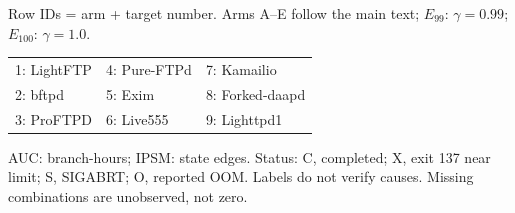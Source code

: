\begingroup
\small
\setlength{\tabcolsep}{1.6pt}
\renewcommand{\arraystretch}{1.0}
\noindent Row IDs = arm + target number. Arms A--E follow the main text; $E_{99}$: $\gamma=0.99$; $E_{100}$: $\gamma=1.0$.
\par\smallskip
\noindent\begin{tabularx}{\columnwidth}{@{}YYY@{}}
1: LightFTP & 4: Pure-FTPd & 7: Kamailio \\
2: bftpd & 5: Exim & 8: Forked-daapd \\
3: ProFTPD & 6: Live555 & 9: Lighttpd1 \\
\end{tabularx}
\par\smallskip
\noindent AUC: branch-hours; IPSM: state edges. Status: C, completed; X, exit 137 near limit; S, SIGABRT; O, reported OOM. Labels do not verify causes. Missing combinations are unobserved, not zero.
\par\smallskip
{}
\label{tab:archive_arms}
\tabletail{\bottomrule}
\tablelasttail{\bottomrule}

